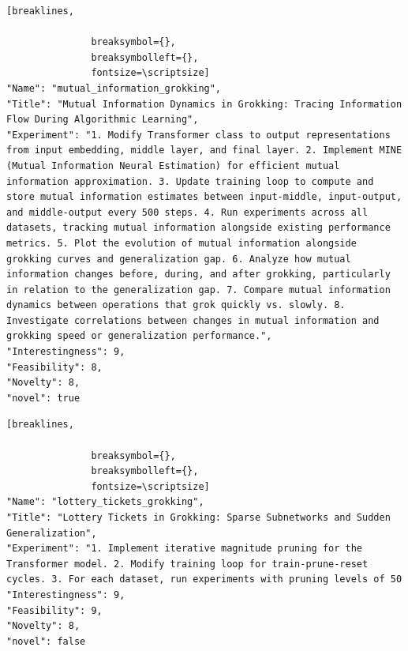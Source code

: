 \begin{tcolorbox}[
  breakable,
  colback  = blue!5!white,
  colframe = blue!75!black,
  title    = {Idea 46/50 - \texttt{mutual\_information\_grokking}},
  fontupper=\scriptsize\ttfamily,
]
\begin{Verbatim}[breaklines,

               breaksymbol={},
               breaksymbolleft={},
               fontsize=\scriptsize]
"Name": "mutual_information_grokking",
"Title": "Mutual Information Dynamics in Grokking: Tracing Information Flow During Algorithmic Learning",
"Experiment": "1. Modify Transformer class to output representations from input embedding, middle layer, and final layer. 2. Implement MINE (Mutual Information Neural Estimation) for efficient mutual information approximation. 3. Update training loop to compute and store mutual information estimates between input-middle, input-output, and middle-output every 500 steps. 4. Run experiments across all datasets, tracking mutual information alongside existing performance metrics. 5. Plot the evolution of mutual information alongside grokking curves and generalization gap. 6. Analyze how mutual information changes before, during, and after grokking, particularly in relation to the generalization gap. 7. Compare mutual information dynamics between operations that grok quickly vs. slowly. 8. Investigate correlations between changes in mutual information and grokking speed or generalization performance.",
"Interestingness": 9,
"Feasibility": 8,
"Novelty": 8,
"novel": true
\end{Verbatim}
\end{tcolorbox}

\begin{tcolorbox}[
  breakable,
  colback  = blue!5!white,
  colframe = blue!75!black,
  title    = {Idea 47/50 - \texttt{lottery\_tickets\_grokking}},
  fontupper=\scriptsize\ttfamily,
]
\begin{Verbatim}[breaklines,

               breaksymbol={},
               breaksymbolleft={},
               fontsize=\scriptsize]
"Name": "lottery_tickets_grokking",
"Title": "Lottery Tickets in Grokking: Sparse Subnetworks and Sudden Generalization",
"Experiment": "1. Implement iterative magnitude pruning for the Transformer model. 2. Modify training loop for train-prune-reset cycles. 3. For each dataset, run experiments with pruning levels of 50
"Interestingness": 9,
"Feasibility": 9,
"Novelty": 8,
"novel": false
\end{Verbatim}
\end{tcolorbox}

